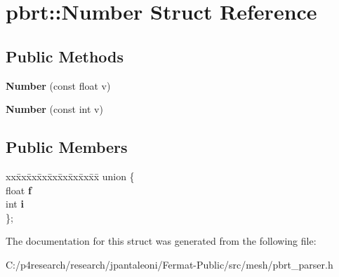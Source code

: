 \hypertarget{structpbrt_1_1_number}{}\section{pbrt\+:\+:Number Struct Reference}
\label{structpbrt_1_1_number}
\subsection*{Public Methods}
\begin{DoxyCompactItemize}
\item 
\mbox{\label{structpbrt_1_1_number_a4f56bf22511d55859ea4060a2235a386}} 
{\bfseries Number} (const float v)
\item 
\mbox{\label{structpbrt_1_1_number_a66e4c73609aa0e6bacfbf3eeee2bbbd2}} 
{\bfseries Number} (const int v)
\end{DoxyCompactItemize}
\subsection*{Public Members}
\begin{DoxyCompactItemize}
\item 
\mbox{\label{structpbrt_1_1_number_a3de5b9745c7e49b5aa9045d62618213e}} 
\begin{tabbing}
xx\=xx\=xx\=xx\=xx\=xx\=xx\=xx\=xx\=\kill
union \{\\
\>float {\bfseries f}\\
\>int {\bfseries i}\\
\}; \\

\end{tabbing}\end{DoxyCompactItemize}


The documentation for this struct was generated from the following file\+:\begin{DoxyCompactItemize}
\item 
C\+:/p4research/research/jpantaleoni/\+Fermat-\/\+Public/src/mesh/pbrt\+\_\+parser.\+h\end{DoxyCompactItemize}
